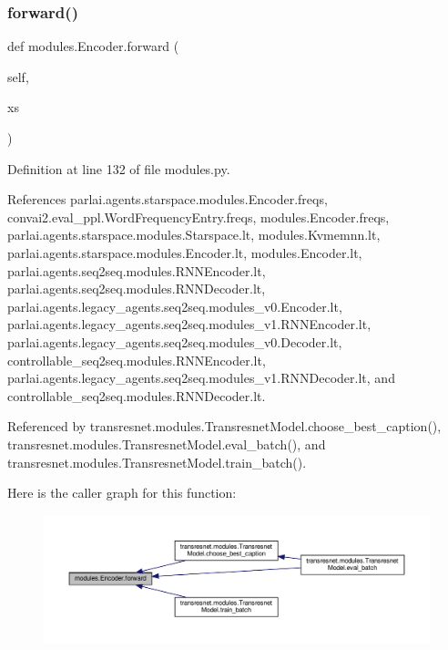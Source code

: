 \subsubsection{\texorpdfstring{forward()}{forward()}}
{\footnotesize\ttfamily def modules.\+Encoder.\+forward (\begin{DoxyParamCaption}\item[{}]{self,  }\item[{}]{xs }\end{DoxyParamCaption})}



Definition at line 132 of file modules.\+py.



References parlai.\+agents.\+starspace.\+modules.\+Encoder.\+freqs, convai2.\+eval\+\_\+ppl.\+Word\+Frequency\+Entry.\+freqs, modules.\+Encoder.\+freqs, parlai.\+agents.\+starspace.\+modules.\+Starspace.\+lt, modules.\+Kvmemnn.\+lt, parlai.\+agents.\+starspace.\+modules.\+Encoder.\+lt, modules.\+Encoder.\+lt, parlai.\+agents.\+seq2seq.\+modules.\+R\+N\+N\+Encoder.\+lt, parlai.\+agents.\+seq2seq.\+modules.\+R\+N\+N\+Decoder.\+lt, parlai.\+agents.\+legacy\+\_\+agents.\+seq2seq.\+modules\+\_\+v0.\+Encoder.\+lt, parlai.\+agents.\+legacy\+\_\+agents.\+seq2seq.\+modules\+\_\+v1.\+R\+N\+N\+Encoder.\+lt, parlai.\+agents.\+legacy\+\_\+agents.\+seq2seq.\+modules\+\_\+v0.\+Decoder.\+lt, controllable\+\_\+seq2seq.\+modules.\+R\+N\+N\+Encoder.\+lt, parlai.\+agents.\+legacy\+\_\+agents.\+seq2seq.\+modules\+\_\+v1.\+R\+N\+N\+Decoder.\+lt, and controllable\+\_\+seq2seq.\+modules.\+R\+N\+N\+Decoder.\+lt.



Referenced by transresnet.\+modules.\+Transresnet\+Model.\+choose\+\_\+best\+\_\+caption(), transresnet.\+modules.\+Transresnet\+Model.\+eval\+\_\+batch(), and transresnet.\+modules.\+Transresnet\+Model.\+train\+\_\+batch().

Here is the caller graph for this function\+:
\nopagebreak
\begin{figure}[H]
\begin{center}
\leavevmode
\includegraphics[width=350pt]{classmodules_1_1Encoder_aeddb8f48da70ad07b3b86e3183eb87fa_icgraph}
\end{center}
\end{figure}


